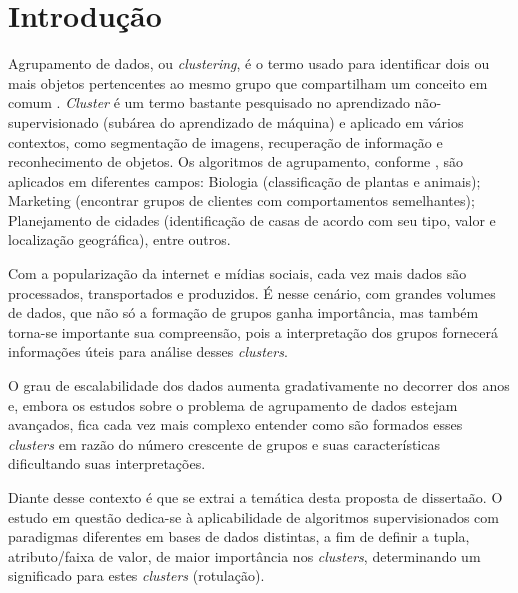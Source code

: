 

\chapter{Introdução} \label{cap:introd}

Agrupamento de dados, ou \textit{clustering}, é o termo usado para identificar dois ou  mais objetos pertencentes ao mesmo grupo que compartilham um conceito em comum    \cite{Kumar2013}. \textit{Cluster} é um termo bastante pesquisado no aprendizado não-supervisionado (subárea do aprendizado de máquina) e aplicado em vários contextos, como segmentação de imagens, recuperação de informação e reconhecimento de objetos. Os algoritmos de agrupamento, conforme , são aplicados em diferentes campos: Biologia (classificação de plantas e animais); Marketing (encontrar grupos de clientes com comportamentos semelhantes); Planejamento de cidades (identificação de casas de acordo com seu tipo, valor e localização geográfica), entre outros. 


Com a popularização da internet e mídias sociais, cada vez mais dados são processados, transportados e produzidos. É nesse cenário, com grandes volumes de dados, que não só a formação de grupos ganha importância, mas também torna-se importante sua compreensão, pois a interpretação dos grupos fornecerá informações úteis para análise desses \textit{clusters}. 

O grau de escalabilidade dos dados aumenta gradativamente no decorrer dos anos e, embora os estudos sobre o problema de agrupamento de dados estejam avançados, fica cada vez mais complexo entender como são formados esses \textit{clusters} em razão do número crescente de grupos e suas características dificultando suas interpretações. 

Diante desse contexto é que se extrai a temática desta proposta de dissertaão. O estudo em questão dedica-se à aplicabilidade de algoritmos supervisionados com paradigmas diferentes em bases de dados distintas, a fim de definir a tupla, atributo/faixa de valor, de maior importância nos \textit{clusters}, determinando um significado para estes \textit{clusters} (rotulação). 

